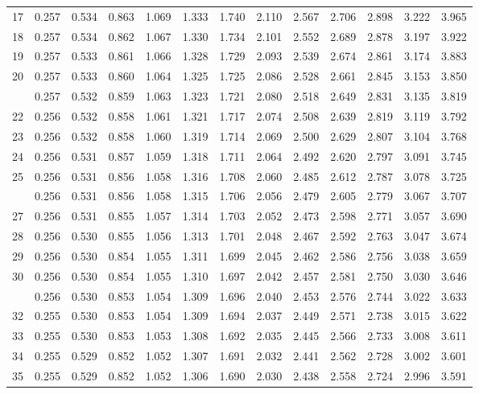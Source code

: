 \documentclass[
]{article}
\begin{document}
\begin{longtable}[t]{lrrrrrrrrrrrr}
17 & 0.257 & 0.534 & 0.863 & 1.069 & 1.333 & 1.740 & 2.110 & 2.567 & 2.706 & 2.898 & 3.222 & 3.965\\
18 & 0.257 & 0.534 & 0.862 & 1.067 & 1.330 & 1.734 & 2.101 & 2.552 & 2.689 & 2.878 & 3.197 & 3.922\\
19 & 0.257 & 0.533 & 0.861 & 1.066 & 1.328 & 1.729 & 2.093 & 2.539 & 2.674 & 2.861 & 3.174 & 3.883\\
20 & 0.257 & 0.533 & 0.860 & 1.064 & 1.325 & 1.725 & 2.086 & 2.528 & 2.661 & 2.845 & 3.153 & 3.850\\
\addlinespace
21 & 0.257 & 0.532 & 0.859 & 1.063 & 1.323 & 1.721 & 2.080 & 2.518 & 2.649 & 2.831 & 3.135 & 3.819\\
22 & 0.256 & 0.532 & 0.858 & 1.061 & 1.321 & 1.717 & 2.074 & 2.508 & 2.639 & 2.819 & 3.119 & 3.792\\
23 & 0.256 & 0.532 & 0.858 & 1.060 & 1.319 & 1.714 & 2.069 & 2.500 & 2.629 & 2.807 & 3.104 & 3.768\\
24 & 0.256 & 0.531 & 0.857 & 1.059 & 1.318 & 1.711 & 2.064 & 2.492 & 2.620 & 2.797 & 3.091 & 3.745\\
25 & 0.256 & 0.531 & 0.856 & 1.058 & 1.316 & 1.708 & 2.060 & 2.485 & 2.612 & 2.787 & 3.078 & 3.725\\
\addlinespace
26 & 0.256 & 0.531 & 0.856 & 1.058 & 1.315 & 1.706 & 2.056 & 2.479 & 2.605 & 2.779 & 3.067 & 3.707\\
27 & 0.256 & 0.531 & 0.855 & 1.057 & 1.314 & 1.703 & 2.052 & 2.473 & 2.598 & 2.771 & 3.057 & 3.690\\
28 & 0.256 & 0.530 & 0.855 & 1.056 & 1.313 & 1.701 & 2.048 & 2.467 & 2.592 & 2.763 & 3.047 & 3.674\\
29 & 0.256 & 0.530 & 0.854 & 1.055 & 1.311 & 1.699 & 2.045 & 2.462 & 2.586 & 2.756 & 3.038 & 3.659\\
30 & 0.256 & 0.530 & 0.854 & 1.055 & 1.310 & 1.697 & 2.042 & 2.457 & 2.581 & 2.750 & 3.030 & 3.646\\
\addlinespace
31 & 0.256 & 0.530 & 0.853 & 1.054 & 1.309 & 1.696 & 2.040 & 2.453 & 2.576 & 2.744 & 3.022 & 3.633\\
32 & 0.255 & 0.530 & 0.853 & 1.054 & 1.309 & 1.694 & 2.037 & 2.449 & 2.571 & 2.738 & 3.015 & 3.622\\
33 & 0.255 & 0.530 & 0.853 & 1.053 & 1.308 & 1.692 & 2.035 & 2.445 & 2.566 & 2.733 & 3.008 & 3.611\\
34 & 0.255 & 0.529 & 0.852 & 1.052 & 1.307 & 1.691 & 2.032 & 2.441 & 2.562 & 2.728 & 3.002 & 3.601\\
35 & 0.255 & 0.529 & 0.852 & 1.052 & 1.306 & 1.690 & 2.030 & 2.438 & 2.558 & 2.724 & 2.996 & 3.591\\

\end{longtable}
\end{document}
